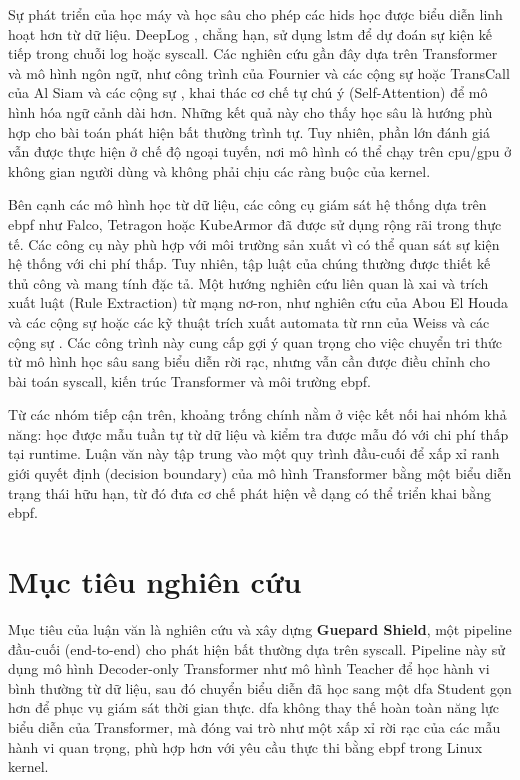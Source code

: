 \documentclass[../main.tex]{subfiles}
\begin{document}
Sự phát triển của học máy và học sâu cho phép các \gls{hids} học
được biểu diễn linh hoạt hơn từ dữ liệu. DeepLog
\cite{du2017deeplog}, chẳng hạn, sử dụng \gls{lstm} để dự đoán sự kiện kế
tiếp trong chuỗi log hoặc \gls{syscall}. Các nghiên cứu gần đây dựa trên
Transformer và mô hình ngôn ngữ, như công trình của Fournier và các
cộng sự \cite{fournier2023language} hoặc TransCall của Al Siam và các
cộng sự \cite{alsiam2026transcall}, khai thác cơ chế tự chú ý
(Self-Attention) để mô hình hóa ngữ cảnh dài hơn. Những kết quả này
cho thấy học sâu là hướng phù hợp cho bài toán phát hiện bất thường
trình tự. Tuy nhiên, phần lớn đánh giá vẫn được thực hiện ở chế độ
ngoại tuyến, nơi mô hình có thể chạy trên \gls{cpu}/\gls{gpu} ở không gian người
dùng và không phải chịu các ràng buộc của kernel.

Bên cạnh các mô hình học từ dữ liệu, các công cụ giám sát hệ thống
dựa trên \gls{ebpf} như Falco, Tetragon hoặc KubeArmor
\cite{her2025indepth} đã được sử dụng rộng rãi trong thực tế. Các
công cụ này phù hợp với môi trường sản xuất vì có thể quan sát sự
kiện hệ thống với chi phí thấp. Tuy nhiên, tập luật của chúng thường
được thiết kế thủ công và mang tính đặc tả. Một hướng nghiên cứu liên
quan là \gls{xai} và trích xuất luật (Rule Extraction)
từ mạng nơ-ron, như nghiên cứu của Abou El Houda và các cộng sự
\cite{abouelhouda2022novel} hoặc các kỹ thuật trích xuất automata từ
\gls{rnn} của Weiss và các cộng sự \cite{weiss2018extracting}. Các công trình
này cung cấp gợi ý quan trọng cho việc chuyển tri thức từ mô hình
học sâu sang biểu diễn rời rạc, nhưng vẫn cần được điều chỉnh cho bài
toán \gls{syscall}, kiến trúc Transformer và môi trường \gls{ebpf}\@.

Từ các nhóm tiếp cận trên, khoảng trống chính nằm ở việc kết nối hai nhóm
khả năng: học được mẫu tuần tự từ dữ liệu và kiểm tra được mẫu đó với
chi phí thấp tại runtime. Luận văn này tập trung vào một quy trình
đầu-cuối để xấp xỉ ranh giới quyết định (decision boundary) của mô
hình Transformer bằng một biểu diễn trạng thái hữu hạn, từ đó đưa cơ
chế phát hiện về dạng có thể triển khai bằng \gls{ebpf}\@.

\section{Mục tiêu nghiên cứu}
\label{sec:muc-tieu}

Mục tiêu của luận văn là nghiên cứu và xây dựng \textbf{Guepard
Shield}, một pipeline đầu-cuối (end-to-end) cho phát hiện bất thường
dựa trên \gls{syscall}. Pipeline này sử dụng mô hình Decoder-only
Transformer như mô hình Teacher để học hành vi bình thường từ dữ
liệu, sau đó chuyển biểu diễn đã học sang một \gls{dfa} Student gọn hơn để
phục vụ giám sát thời gian thực. \Gls{dfa} không thay thế hoàn toàn năng
lực biểu diễn của Transformer, mà đóng vai trò như một xấp xỉ rời rạc
của các mẫu hành vi quan trọng, phù hợp hơn với yêu cầu thực thi bằng
\gls{ebpf} trong Linux kernel.
\end{document}
